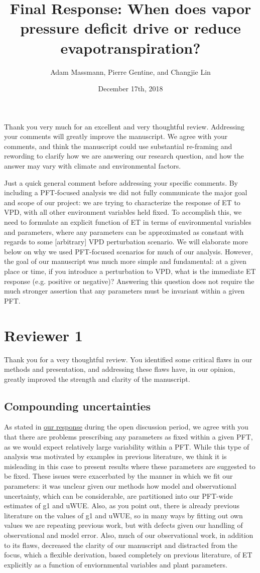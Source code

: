 \documentclass[12pt]{article}
\title{Final Response: When does vapor pressure deficit drive or
  reduce evapotranspiration?}
\author{Adam Massmann, Pierre Gentine, and Changjie Lin}
\date{December 17th, 2018}
\begin{document}
Thank you very much for an excellent and very thoughtful
review. Addressing your comments will greatly improve the
manuscript. We agree with your comments, and think the manuscript
could use substantial re-framing and rewording to clarify how we are
answering our research question, and how the answer may vary with
climate and environmental factors.

Just a quick general comment before addressing your specific
comments. By including a PFT-focused analysis we did not fully
communicate the major goal and scope of our project: we are trying to
characterize the response of ET to VPD, with all other environment
variables held fixed. To accomplish this, we need to formulate an
explicit function of ET in terms of environmental variables and
parameters, where any parameters can be approximated as constant with
regards to some [arbitrary] VPD perturbation scenario. We will
elaborate more below on why we used PFT-focused scenarios for much of
our analysis. However, the goal of our manuscript was much more simple
and fundamental: at a given place or time, if you introduce a
perturbation to VPD, what is the immediate ET response (e.g. positive
or negative)? Answering this question does not require the much
stronger assertion that any parameters must be invariant within a
given PFT.

\section{Reviewer 1}

Thank you for a very thoughtful review. You identified some critical
flaws in our methods and presentation, and addressing these flaws
have, in our opinion, greatly improved the strength and clarity of the
manuscript.

\subsection{Compounding uncertainties}
\label{pft}
As stated in
\href{https://editor.copernicus.org/index.php/hess-2018-553-AC1.pdf}{our
response} during the open discussion period, we agree
with you that there are problems prescribing any parameters as fixed
within a given PFT, as we would expect relatively large variability
within a PFT. While this type of analysis was motivated by examples in
previous literature, we think it is misleading in this case to present
results where these parameters are suggested to be fixed. These issues
were exacerbated by the manner in which we fit our parameters: it was
unclear given our methods how model and observational uncertainty,
which can be considerable, are partitioned into our PFT-wide estimates
of g1 and uWUE. Also, as you point out, there is already previous
literature on the values of g1 and uWUE, so in many ways by fitting
out own values we are repeating previous work, but with defects given
our handling of observational and model error. Also, much of our
observational work, in addition to its flaws, decreased the clarity of
our manuscript and distracted from the focus, which a flexible
derivation, based completely on previous literature, of ET explicitly
as a function of enviornmental variables and plant parameters.
\end{document}
